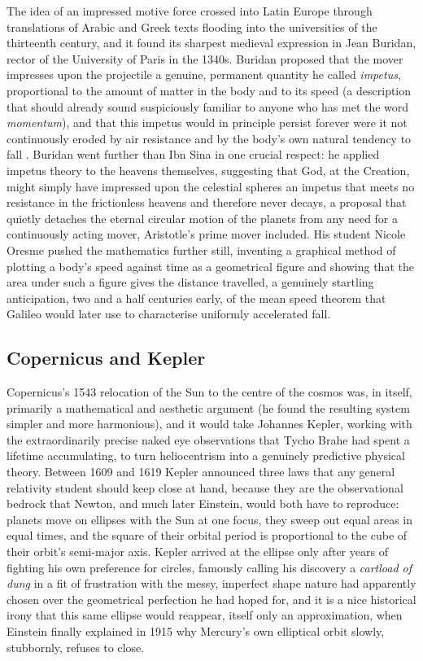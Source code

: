     The idea of an impressed motive force crossed into Latin Europe through translations of Arabic and Greek texts flooding into the universities of the thirteenth century, and it found its sharpest medieval expression in Jean Buridan, rector of the University of Paris in the 1340s. Buridan proposed that the mover impresses upon the projectile a genuine, permanent quantity he called \textit{impetus}, proportional to the amount of matter in the body and to its speed (a description that should already sound suspiciously familiar to anyone who has met the word \textit{momentum}), and that this impetus would in principle persist forever were it not continuously eroded by air resistance and by the body's own natural tendency to fall \citep{clagett1959}. Buridan went further than Ibn Sina in one crucial respect: he applied impetus theory to the heavens themselves, suggesting that God, at the Creation, might simply have impressed upon the celestial spheres an impetus that meets no resistance in the frictionless heavens and therefore never decays, a proposal that quietly detaches the eternal circular motion of the planets from any need for a continuously acting mover, Aristotle's prime mover included. His student Nicole Oresme pushed the mathematics further still, inventing a graphical method of plotting a body's speed against time as a geometrical figure and showing that the area under such a figure gives the distance travelled, a genuinely startling anticipation, two and a half centuries early, of the mean speed theorem that Galileo would later use to characterise uniformly accelerated fall.

    \subsection{Copernicus and Kepler}

    Copernicus's 1543 relocation of the Sun to the centre of the cosmos was, in itself, primarily a mathematical and aesthetic argument (he found the resulting system simpler and more harmonious), and it would take Johannes Kepler, working with the extraordinarily precise naked eye observations that Tycho Brahe had spent a lifetime accumulating, to turn heliocentrism into a genuinely predictive physical theory. Between 1609 and 1619 Kepler announced three laws that any general relativity student should keep close at hand, because they are the observational bedrock that Newton, and much later Einstein, would both have to reproduce: planets move on ellipses with the Sun at one focus, they sweep out equal areas in equal times, and the square of their orbital period is proportional to the cube of their orbit's semi-major axis. Kepler arrived at the ellipse only after years of fighting his own preference for circles, famously calling his discovery a \textit{cartload of dung} in a fit of frustration with the messy, imperfect shape nature had apparently chosen over the geometrical perfection he had hoped for, and it is a nice historical irony that this same ellipse would reappear, itself only an approximation, when Einstein finally explained in 1915 why Mercury's own elliptical orbit slowly, stubbornly, refuses to close.

